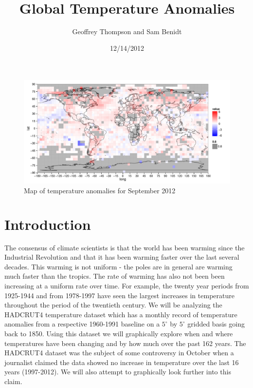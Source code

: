 \documentclass{article}\usepackage{graphicx, color}
\title{Global Temperature Anomalies}
\author{Geoffrey Thompson and Sam Benidt}
\date{12/14/2012}
\newenvironment{knitrout}{}{} %
\begin{document}
\maketitle




\begin{figure}[H]
\begin{knitrout}
\color{fgcolor}\includegraphics[width=\linewidth]{figure/recent-map} 
\end{knitrout}

\caption{\label{sep2012map}Map of temperature anomalies for September 2012}
\end{figure}

\section{Introduction}

The consensus of climate scientists is that the world has been warming since the Industrial Revolution and that it has been warming faster over the last several decades. This warming is not uniform - the poles are in general are warming much faster than the tropics. The rate of warming has also not been been increasing at a uniform rate over time. For example, the twenty year periods from 1925-1944 and from 1978-1997 have seen the largest increases in temperature throughout the period of the twentieth century. We will be analyzing the HADCRUT4 temperature dataset which has a monthly record of temperature anomalies from a respective 1960-1991 baseline on a $5^{\circ}$ by $5^{\circ}$ gridded basis going back to 1850.  Using this dataset we will graphically explore when and where temperatures have been changing and by how much over the past 162 years. The HADCRUT4 dataset was the subject of some controversy in October when a journalist claimed the data showed no increase in temperature over the last 16 years (1997-2012). We will also attempt to graphically look further into this claim.
\end{document}

